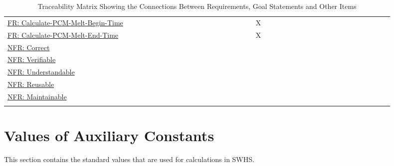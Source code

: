 \documentclass[12pt]{article}
\begin{document}
\begin{longtable}{l l l l l l l l l l l l l l l l l l l l l l l l l l l l l l l l l l l l l l}
\\
\hyperref[calcPCMMeltBegin]{FR: Calculate-PCM-Melt-Begin-Time} &  &  &  &  &  &  &  &  &  &  &  &  &  &  &  &  &  &  & X &  &  &  &  &  &  &  &  &  &  &  &  &  &  &  &  &  & 
\\
\hyperref[calcPCMMeltEnd]{FR: Calculate-PCM-Melt-End-Time} &  &  &  &  &  &  &  &  &  &  &  &  &  &  &  &  &  &  & X &  &  &  &  &  &  &  &  &  &  &  &  &  &  &  &  &  & 
\\
\hyperref[correct]{NFR: Correct} &  &  &  &  &  &  &  &  &  &  &  &  &  &  &  &  &  &  &  &  &  &  &  &  &  &  &  &  &  &  &  &  &  &  &  &  & 
\\
\hyperref[verifiable]{NFR: Verifiable} &  &  &  &  &  &  &  &  &  &  &  &  &  &  &  &  &  &  &  &  &  &  &  &  &  &  &  &  &  &  &  &  &  &  &  &  & 
\\
\hyperref[understandable]{NFR: Understandable} &  &  &  &  &  &  &  &  &  &  &  &  &  &  &  &  &  &  &  &  &  &  &  &  &  &  &  &  &  &  &  &  &  &  &  &  & 
\\
\hyperref[reusable]{NFR: Reusable} &  &  &  &  &  &  &  &  &  &  &  &  &  &  &  &  &  &  &  &  &  &  &  &  &  &  &  &  &  &  &  &  &  &  &  &  & 
\\
\hyperref[maintainable]{NFR: Maintainable} &  &  &  &  &  &  &  &  &  &  &  &  &  &  &  &  &  &  &  &  &  &  &  &  &  &  &  &  &  &  &  &  &  &  &  &  & 
\\
\bottomrule
\caption{Traceability Matrix Showing the Connections Between Requirements, Goal Statements and Other Items}
\label{Table:TraceMatAllvsR}
\end{longtable}
\section{Values of Auxiliary Constants}
\label{Sec:AuxConstants}
This section contains the standard values that are used for calculations in SWHS.
\end{document}
